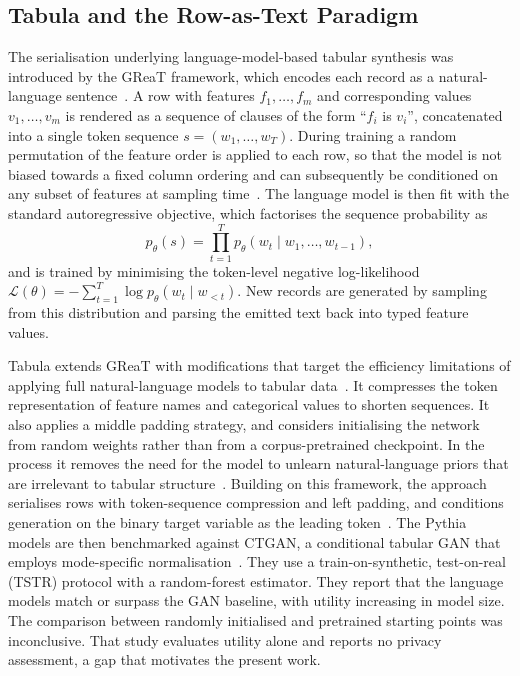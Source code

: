 \subsection{Tabula and the Row-as-Text Paradigm}
\label{sec:bg:llm:tabula}

The serialisation underlying language-model-based tabular synthesis was
introduced by the GReaT framework, which encodes each record as a
natural-language sentence~\cite{Borisov2023GReaT}. A row with features
$f_1, \dots, f_m$ and corresponding values $v_1, \dots, v_m$ is rendered as a
sequence of clauses of the form ``$f_i$ is $v_i$'', concatenated into a single
token sequence $s = (w_1, \dots, w_T)$. During training a random permutation
of the feature order is applied to each row, so that the model is not biased
towards a fixed column ordering and can subsequently be conditioned on any
subset of features at sampling time~\cite{Borisov2023GReaT}. The language
model is then fit with the standard autoregressive objective, which
factorises the sequence probability as
\begin{equation}
\label{eq:bg:llm:ar}
p_\theta(s) = \prod_{t=1}^{T} p_\theta\!\left(w_t \mid w_1, \dots, w_{t-1}\right),
\end{equation}
and is trained by minimising the token-level negative log-likelihood
$\mathcal{L}(\theta) = -\sum_{t=1}^{T} \log p_\theta(w_t \mid w_{<t})$. New
records are generated by sampling from this distribution and parsing the
emitted text back into typed feature values.

Tabula extends GReaT with modifications that target the efficiency
limitations of applying full natural-language models to tabular
data~\cite{Zhao2023Tabula}. It compresses the token representation of feature
names and categorical values to shorten sequences. It also applies a middle padding
strategy, and considers initialising the network from random weights rather
than from a corpus-pretrained checkpoint. In the process it removes the need for the model
to unlearn natural-language priors that are irrelevant to tabular
structure~\cite{Zhao2023Tabula}. Building on this framework, the 
approach serialises rows with token-sequence
compression and left padding, and conditions generation on the binary target
variable as the leading token~\cite{Miletic2024}. The Pythia models are then
benchmarked against CTGAN, a conditional tabular GAN that employs mode-specific
normalisation~\cite{Xu2019CTGAN}. 
They use a train-on-synthetic, test-on-real (TSTR) protocol with a random-forest 
estimator. They report that the language models match or surpass the GAN 
baseline, with utility increasing in model size. The comparison between 
randomly initialised and pretrained starting points was inconclusive. That study evaluates
utility alone and reports no privacy assessment, a gap that motivates the
present work.

